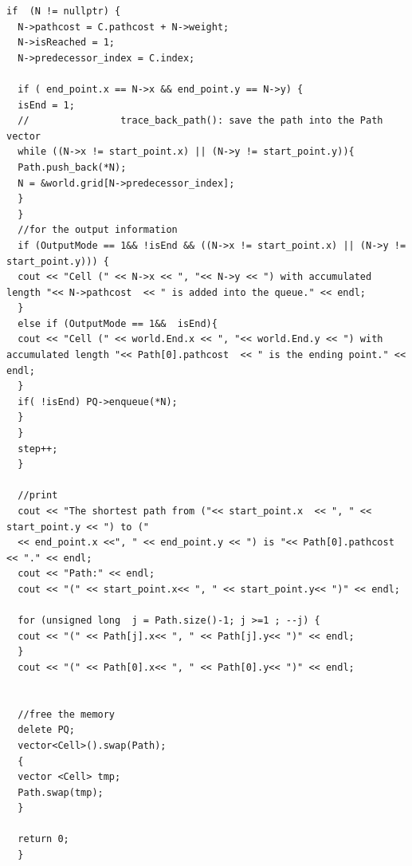 \documentclass[12pt,a4paper]{article}
\theoremstyle{definition}
\begin{document}
\begin{lstlisting}[caption={main.cpp}]
  if  (N != nullptr) {
  N->pathcost = C.pathcost + N->weight;
  N->isReached = 1;
  N->predecessor_index = C.index;
  
  if ( end_point.x == N->x && end_point.y == N->y) {
  isEnd = 1;
  //                trace_back_path(): save the path into the Path vector
  while ((N->x != start_point.x) || (N->y != start_point.y)){
  Path.push_back(*N);
  N = &world.grid[N->predecessor_index];
  }
  }
  //for the output information
  if (OutputMode == 1&& !isEnd && ((N->x != start_point.x) || (N->y != start_point.y))) {
  cout << "Cell (" << N->x << ", "<< N->y << ") with accumulated length "<< N->pathcost  << " is added into the queue." << endl;
  }
  else if (OutputMode == 1&&  isEnd){
  cout << "Cell (" << world.End.x << ", "<< world.End.y << ") with accumulated length "<< Path[0].pathcost  << " is the ending point." << endl;
  }
  if( !isEnd) PQ->enqueue(*N);
  }
  }
  step++;
  }
  
  //print
  cout << "The shortest path from ("<< start_point.x  << ", " << start_point.y << ") to ("
  << end_point.x <<", " << end_point.y << ") is "<< Path[0].pathcost << "." << endl;
  cout << "Path:" << endl;
  cout << "(" << start_point.x<< ", " << start_point.y<< ")" << endl;
  
  for (unsigned long  j = Path.size()-1; j >=1 ; --j) {
  cout << "(" << Path[j].x<< ", " << Path[j].y<< ")" << endl;
  }
  cout << "(" << Path[0].x<< ", " << Path[0].y<< ")" << endl;
  
  
  //free the memory
  delete PQ;
  vector<Cell>().swap(Path);
  {
  vector <Cell> tmp;
  Path.swap(tmp);
  }
  
  return 0;
  }
  
   \end{lstlisting}
 
 
 
\end{document}
